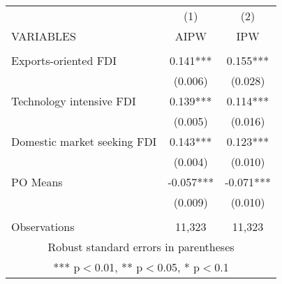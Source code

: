 \documentclass[]{article}
\begin{document}
\begin{tabular}{lcc} \hline
 & (1) & (2)  \\
VARIABLES & AIPW & IPW \\ \hline
 &  &      \\
Exports-oriented FDI & 0.141***&   0.155***   \\
 & (0.006)   & (0.028)  \\
Technology intensive FDI & 0.139*** &   0.114***   \\
 & (0.005)   & (0.016)   \\
Domestic market seeking FDI & 0.143*** &   0.123***  \\
 & (0.004)   & (0.010)   \\
PO Means &  -0.057*** &   -0.071*** \\
 &   (0.009) &   (0.010) \\
 &  &      \\
 Observations & 11,323 & 11,323  \\ \hline
\multicolumn{3}{c}{ Robust standard errors in parentheses} \\
\multicolumn{3}{c}{ *** p$<$0.01, ** p$<$0.05, * p$<$0.1} \\
\end{tabular}
\end{document}
